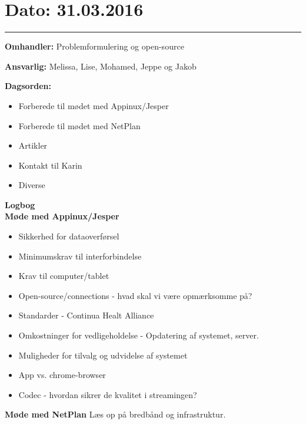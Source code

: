 \section{Dato: 31.03.2016}
\hrule

\textbf{Omhandler:} Problemformulering og open-source

\textbf{Ansvarlig:} Melissa, Lise, Mohamed, Jeppe og Jakob

\textbf{Dagsorden:}
\begin{itemize}
	\item Forberede til mødet med Appinux/Jesper
	\item Forberede til mødet med NetPlan
	\item Artikler
	\item Kontakt til Karin
	\item Diverse
\end{itemize}

\textbf{Logbog}
\\

\textbf{Møde med Appinux/Jesper}
\begin{itemize}
	\item Sikkerhed for dataoverførsel
	\item Minimumskrav til interforbindelse 
	\item Krav til computer/tablet
	\item Open-source/connections - hvad skal vi være opmærksomme på?
	\item Standarder - Continua Healt Alliance
	\item Omkostninger for vedligeholdelse - Opdatering af systemet, server.
	\item Muligheder for tilvalg og udvidelse af systemet
	\item App vs. chrome-browser
	\item Codec - hvordan sikrer de kvalitet i streamingen?
\end{itemize}


\textbf{Møde med NetPlan}
Læs op på bredbånd og infrastruktur.\\

